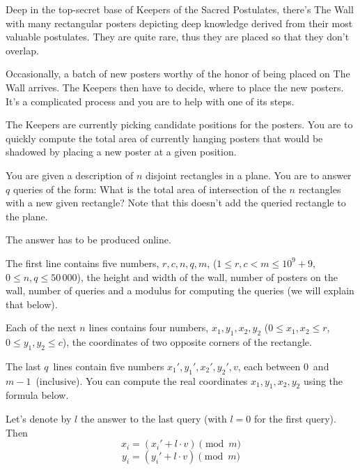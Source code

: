 





Deep in the top-secret base of Keepers of the Sacred Postulates, there's The
Wall with many rectangular posters depicting deep knowledge derived from their
most valuable postulates. They are quite rare, thus they are placed so that they don't overlap.

Occasionally, a batch of new posters worthy of the honor of
being placed on The Wall arrives. The Keepers then have to decide, where to place
the new posters. It's a complicated process and you are to help with one of its steps.

The Keepers are currently picking candidate positions for the posters. You are
to quickly compute the total area of currently hanging posters that would
be shadowed by placing a new poster at a given position.


You are given a description of $n$ disjoint rectangles in a plane. You are to answer
$q$ queries of the form: What is the total area of intersection of the $n$ rectangles
with a new given rectangle? Note that this doesn't add the queried rectangle to the plane.

The answer has to be produced online.


The first line contains five numbers, $r, c, n, q, m$, ($1 \leq r, c < m \leq 10^9 + 9$, $0 \leq n,q \leq 50\,000$),
the height and width of the wall, number of posters on the wall, number of
queries and a modulus for computing the queries (we will explain that below).

Each of the next $n$ lines contains four numbers, $x_1, y_1, x_2, y_2$ ($0 \leq x_1, x_2 \leq r$,
$0 \leq y_1, y_2 \leq c$), the coordinates of two opposite corners of the rectangle.

The last $q$ lines contain five numbers $x_1', y_1', x_2', y_2', v$, each between
$0$ and $m - 1$ (inclusive). You can compute the real coordinates $x_1, y_1, x_2, y_2$
using the formula below.

Let's denote by $l$ the answer to the last query (with $l=0$ for the first query). Then 
$$x_i = (x_i' + l \cdot v) \pmod m$$
$$y_i = (y_i' + l \cdot v) \pmod m$$

